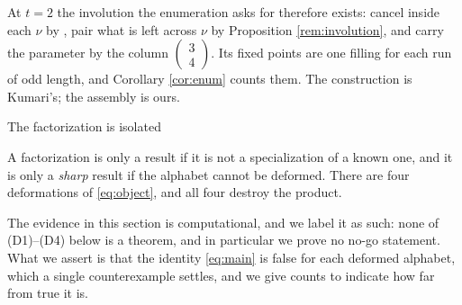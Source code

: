 \documentclass[11pt,reqno]{amsart}
\makeatletter
\renewcommand\section{\@startsection{section}{1}%
  \z@{\linespacing\@plus\linespacing}{.5\linespacing}%
  {\normalfont\large\bfseries\centering}}
\theoremstyle{plain}
\theoremstyle{definition}
\makeatother
\begin{document}
At $t=2$ the involution the enumeration asks for therefore exists: cancel inside each $\nu$ by
\cite[Lemma 2.18]{KumariThesis}, pair what is left across $\nu$ by Proposition \ref{rem:involution},
and carry the parameter by the column $\left(\begin{smallmatrix}3\\4\end{smallmatrix}\right)$. Its
fixed points are one filling for each run of odd length, and Corollary \ref{cor:enum} counts them.
The construction is Kumari's; the assembly is ours.

\section{The factorization is isolated}\label{sec:sharp}

A factorization is only a result if it is not a specialization of a known one, and it is only a
\emph{sharp} result if the alphabet cannot be deformed. There are four deformations of
\eqref{eq:object}, and all four destroy the product.

The evidence in this section is computational, and we label it as such: none of (D1)--(D4) below is
a theorem, and in particular we prove no no-go statement. What we assert is that the identity
\eqref{eq:main} is false for each deformed alphabet, which a single counterexample settles, and we
give counts to indicate how far from true it is.
\end{document}
